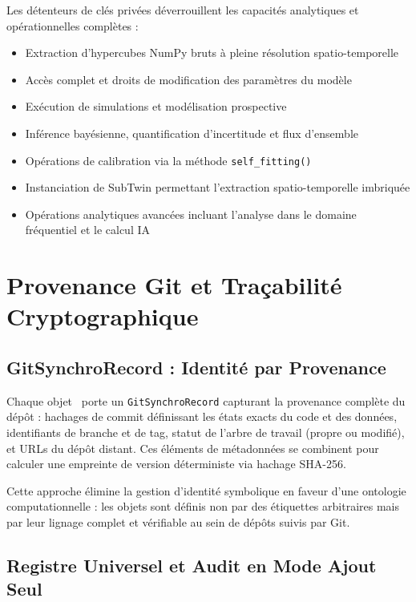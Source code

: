 Les détenteurs de clés privées déverrouillent les capacités analytiques et opérationnelles complètes :
\begin{itemize}
\item Extraction d'hypercubes NumPy bruts à pleine résolution spatio-temporelle
\item Accès complet et droits de modification des paramètres du modèle
\item Exécution de simulations et modélisation prospective
\item Inférence bayésienne, quantification d'incertitude et flux d'ensemble
\item Opérations de calibration via la méthode \texttt{self\_fitting()}
\item Instanciation de SubTwin permettant l'extraction spatio-temporelle imbriquée
\item Opérations analytiques avancées incluant l'analyse dans le domaine fréquentiel et le calcul IA
\end{itemize}

\section*{Provenance Git et Traçabilité Cryptographique}

\subsection*{GitSynchroRecord : Identité par Provenance}

Chaque objet \hydrot\ porte un \texttt{GitSynchroRecord} capturant la provenance complète du dépôt : hachages de commit définissant les états exacts du code et des données, identifiants de branche et de tag, statut de l'arbre de travail (propre ou modifié), et URLs du dépôt distant. Ces éléments de métadonnées se combinent pour calculer une empreinte de version déterministe via hachage SHA-256.

Cette approche élimine la gestion d'identité symbolique en faveur d'une ontologie computationnelle : les objets sont définis non par des étiquettes arbitraires mais par leur lignage complet et vérifiable au sein de dépôts suivis par Git.

\subsection*{Registre Universel et Audit en Mode Ajout Seul}

